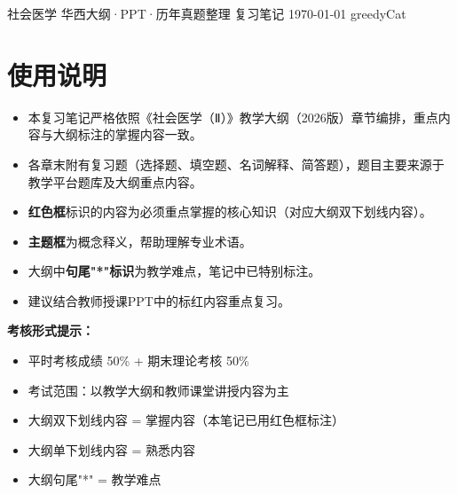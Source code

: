 \documentclass[10pt,a4paper,oneside]{ctexbook}
\begin{document}
\makecover
  {社会医学}
  {华西大纲·PPT·历年真题整理}
  {复习笔记}
  {\today}
  {greedyCat}

\tableofcontents

\chapter*{使用说明}

\begin{itemize}[leftmargin=*]
    \item 本复习笔记严格依照《社会医学（Ⅱ）》教学大纲（2026版）章节编排，重点内容与大纲标注的掌握内容一致。
    \item 各章末附有复习题（选择题、填空题、名词解释、简答题），题目主要来源于教学平台题库及大纲重点内容。
    \item \textbf{\color{keyred}红色框}标识的内容为必须重点掌握的核心知识（对应大纲双下划线内容）。
    \item \textbf{\color{main}主题框}为概念释义，帮助理解专业术语。
    \item 大纲中\textbf{句尾"*"标识}为教学难点，笔记中已特别标注。
    \item 建议结合教师授课PPT中的标红内容重点复习。
\end{itemize}

\vspace{1cm}
\begin{center}
\begin{tcolorbox}[colback=yellow!10, colframe=yellow!80!black, boxrule=0.8pt, arc=6pt, width=0.85\textwidth, breakable]
\textbf{考核形式提示：}
\begin{itemize}[leftmargin=*]
    \item 平时考核成绩 50\% + 期末理论考核 50\%
    \item 考试范围：以教学大纲和教师课堂讲授内容为主
    \item 大纲双下划线内容 = 掌握内容（本笔记已用红色框标注）
    \item 大纲单下划线内容 = 熟悉内容
    \item 大纲句尾"*" = 教学难点
\end{itemize}
\end{tcolorbox}
\end{center}

\newpage

















\end{document}
